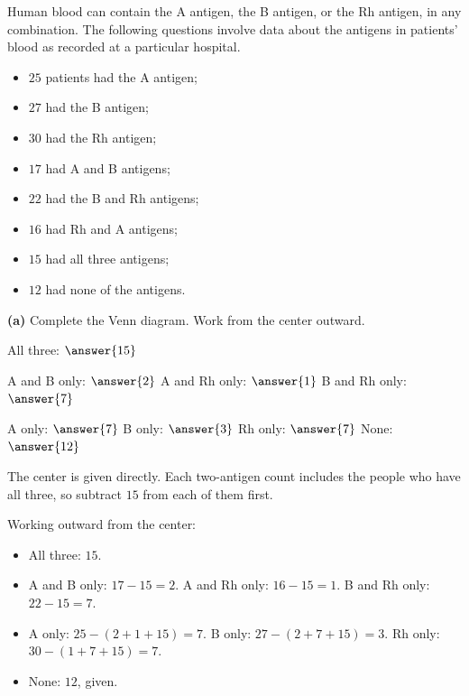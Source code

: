 \documentclass[12pt]{ximera}
\begin{document}
\begin{problem}
Human blood can contain the A antigen, the B antigen, or the Rh antigen, in any
combination. The following questions involve data about the antigens in patients'
blood as recorded at a particular hospital.

\begin{itemize}
    \item $25$ patients had the A antigen;
    \item $27$ had the B antigen;
    \item $30$ had the Rh antigen;
    \item $17$ had A and B antigens;
    \item $22$ had the B and Rh antigens;
    \item $16$ had Rh and A antigens;
    \item $15$ had all three antigens;
    \item $12$ had none of the antigens.
\end{itemize}

\begin{prompt}
\textbf{(a)} Complete the Venn diagram. Work from the center outward.

\begin{center}
\end{center}

All three: $\answer{15}$

\smallskip
A and B only: $\answer{2}$ \qquad
A and Rh only: $\answer{1}$ \qquad
B and Rh only: $\answer{7}$

\smallskip
A only: $\answer{7}$ \qquad
B only: $\answer{3}$ \qquad
Rh only: $\answer{7}$ \qquad
None: $\answer{12}$

\begin{hint}
The center is given directly. Each two-antigen count includes the people who have all
three, so subtract $15$ from each of them first.
\end{hint}

\begin{feedback}
Working outward from the center:
\begin{itemize}
\item All three: $15$.
\item A and B only: $17-15=2$. \quad A and Rh only: $16-15=1$. \quad
      B and Rh only: $22-15=7$.
\item A only: $25-(2+1+15)=7$. \quad B only: $27-(2+7+15)=3$. \quad
      Rh only: $30-(1+7+15)=7$.
\item None: $12$, given.
\end{itemize}
\end{feedback}
\end{prompt}


\end{problem}
\end{document}

